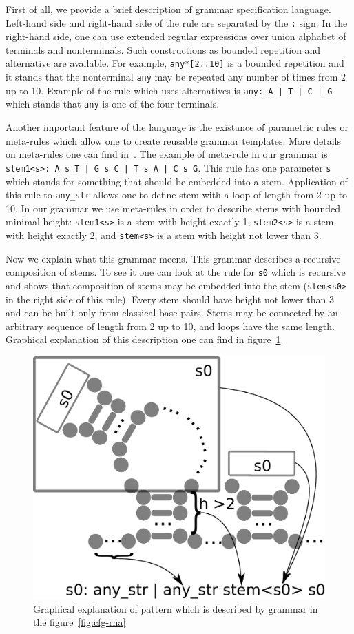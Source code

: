 \documentclass[a4paper,twoside]{article}
\begin{document}
First of all, we provide a brief description of grammar specification language.
Left-hand side and right-hand side of the rule are separated by the \verb|:| sign.
In the right-hand side, one can use extended regular expressions over union alphabet of terminals and nonterminals.
Such constructions as bounded repetition and alternative are available.
For example, \verb|any*[2..10]| is a bounded repetition and it stands that the nonterminal \verb|any| may be repeated any number of times from 2 up to 10.
Example of the rule which uses alternatives is \texttt{any: A | T | C | G} which stands that \verb|any| is one of the four terminals.

Another important feature of the language is the existance of parametric rules or meta-rules which allow one to create reusable grammar templates.
More details on meta-rules one can find in~\cite{Thiemann:2008:MCG:1389449.1389465}.
The example of meta-rule in our grammar is \texttt{stem1<s>: A s T | G s C | T s A | C s G}.
This rule has one parameter \verb|s| which stands for something that should be embedded into a stem.
Application of this rule to \verb|any_str| allows one to define stem with a loop of length from 2 up to 10.
In our grammar we use meta-rules in order to describe stems with bounded minimal height: \verb|stem1<s>| is a stem with height exactly 1,  \verb|stem2<s>| is a stem with height exactly 2, and \verb|stem<s>| is a stem with height not lower than 3.

Now we explain what this grammar meens.
This grammar describes a recursive composition of stems.
To see it one can look at the rule for \verb|s0| which is recursive and shows that composition of stems may be embedded into the stem (\verb|stem<s0>| in the right side of this rule).
Every stem should have height not lower than 3 and can be built only from classical base pairs.
Stems may be connected by an arbitrary sequence of length from 2 up to 10, and loops have the same length.
Graphical explanation of this description one can find in figure~\ref{fig:cfg-rna-graphical}.

\begin{figure}
\centering
\includegraphics[width=.45\textwidth]{figures/16sgrammar.pdf}
\caption{Graphical explanation of pattern which is described by grammar in the figure~\ref{fig:cfg-rna}}
\label{fig:cfg-rna-graphical}
\end{figure}
\end{document}
